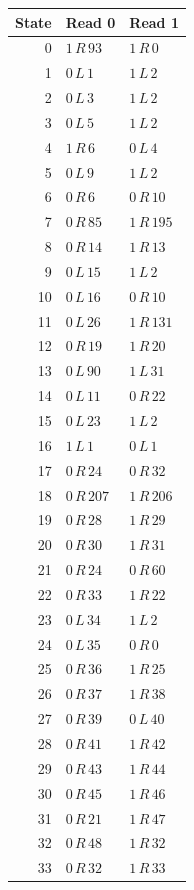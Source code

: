 \begin{longtable}{rll}
\toprule
State & Read 0 & Read 1 \\
\midrule
\endhead
0 & $1\,R\,93$ & $1\,R\,0$ \\
1 & $0\,L\,1$ & $1\,L\,2$ \\
2 & $0\,L\,3$ & $1\,L\,2$ \\
3 & $0\,L\,5$ & $1\,L\,2$ \\
4 & $1\,R\,6$ & $0\,L\,4$ \\
5 & $0\,L\,9$ & $1\,L\,2$ \\
6 & $0\,R\,6$ & $0\,R\,10$ \\
7 & $0\,R\,85$ & $1\,R\,195$ \\
8 & $0\,R\,14$ & $1\,R\,13$ \\
9 & $0\,L\,15$ & $1\,L\,2$ \\
10 & $0\,L\,16$ & $0\,R\,10$ \\
11 & $0\,L\,26$ & $1\,R\,131$ \\
12 & $0\,R\,19$ & $1\,R\,20$ \\
13 & $0\,L\,90$ & $1\,L\,31$ \\
14 & $0\,L\,11$ & $0\,R\,22$ \\
15 & $0\,L\,23$ & $1\,L\,2$ \\
16 & $1\,L\,1$ & $0\,L\,1$ \\
17 & $0\,R\,24$ & $0\,R\,32$ \\
18 & $0\,R\,207$ & $1\,R\,206$ \\
19 & $0\,R\,28$ & $1\,R\,29$ \\
20 & $0\,R\,30$ & $1\,R\,31$ \\
21 & $0\,R\,24$ & $0\,R\,60$ \\
22 & $0\,R\,33$ & $1\,R\,22$ \\
23 & $0\,L\,34$ & $1\,L\,2$ \\
24 & $0\,L\,35$ & $0\,R\,0$ \\
25 & $0\,R\,36$ & $1\,R\,25$ \\
26 & $0\,R\,37$ & $1\,R\,38$ \\
27 & $0\,R\,39$ & $0\,L\,40$ \\
28 & $0\,R\,41$ & $1\,R\,42$ \\
29 & $0\,R\,43$ & $1\,R\,44$ \\
30 & $0\,R\,45$ & $1\,R\,46$ \\
31 & $0\,R\,21$ & $1\,R\,47$ \\
32 & $0\,R\,48$ & $1\,R\,32$ \\
33 & $0\,R\,32$ & $1\,R\,33$ \\

\end{longtable}
